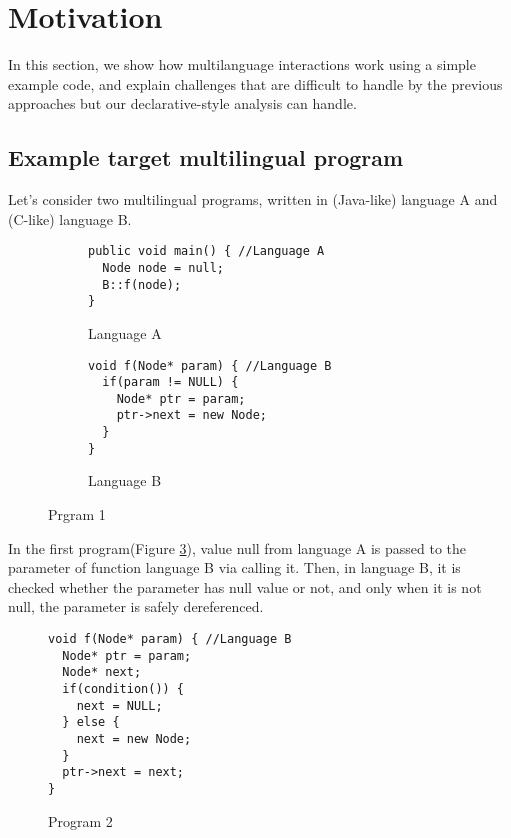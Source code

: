 \section{Motivation}
In this section, we show how multilanguage interactions work using a
simple example code, and explain challenges that are difficult to handle
by the previous approaches but our declarative-style analysis can handle.

\subsection{Example target multilingual program}

Let's consider two multilingual programs, written in (Java-like) language A
and (C-like) language B.
\begin{figure}[t]
  \centering
  \vspace{2mm}
  \begin{subfigure}[t]{0.5\textwidth}
    \begin{lstlisting}[style=java,xleftmargin=2.5em]
public void main() { //Language A
  Node node = null;
  B::f(node);
}
    \end{lstlisting}
    \vspace*{-.5em}
    \caption{Language A}
    \label{fig:exam1:langA}
  \end{subfigure}
  \begin{subfigure}[t]{0.5\textwidth}
    \begin{lstlisting}[style=cpp,firstnumber=5,xleftmargin=2.5em]
void f(Node* param) { //Language B
  if(param != NULL) {
    Node* ptr = param;
    ptr->next = new Node;
  }
}
    \end{lstlisting}
    \vspace*{-.5em}
    \caption{Language B}
    \label{fig:exam1:langB}
  \end{subfigure}
  \vspace*{-.5em}
  \caption{Prgram 1}
  \label{fig:exam1}
\end{figure}

In the first program(Figure \ref{fig:exam1}), value null from language A is
passed to the parameter of function language B via calling it. Then, in
language B, it is checked whether the parameter has null value or not, and only
when it is not null, the parameter is safely dereferenced.

\begin{figure}[t]
  \centering
  \vspace{2mm}
  \begin{lstlisting}[style=cpp,firstnumber=5,xleftmargin=2.5em]
void f(Node* param) { //Language B
  Node* ptr = param;
  Node* next;
  if(condition()) {
    next = NULL;
  } else {
    next = new Node;
  }
  ptr->next = next;
}
  \end{lstlisting}
  \vspace*{-.5em}
  \caption{Program 2}
  \label{fig:exam2}
\end{figure}

